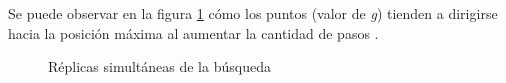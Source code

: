\documentclass{article}
\begin{document}
Se puede observar en la figura \ref{figura 1} cómo los puntos (valor de \textit{g}) tienden a dirigirse hacia la posición máxima al aumentar la cantidad de pasos \cite{gif}.
\begin{figure}[htbp]
\centering
{}
\caption{Réplicas simultáneas de la búsqueda} \label{figura 1}
\end{figure}
\end{document}
